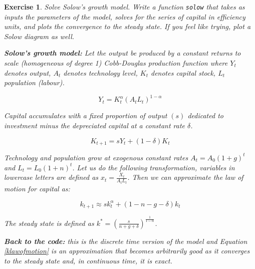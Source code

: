 \documentclass[a4paper,12pt]{article}
\newtheorem{exercise}{Exercise}
\begin{document}
\begin{exercise}
Solve Solow's growth model. Write a function \texttt{solow} that takes as inputs the parameters of the model, solves for the series of capital in efficiency units, and plots the convergence to the steady state. If you feel like trying, plot a Solow diagram as well.
	
	\textbf{Solow's growth model:} Let the output be produced by a constant returns to scale (homogeneous of degree 1) Cobb-Douglas production function where $Y_t$ denotes output, $A_t$ denotes technology level, $K_t$ denotes capital stock, $L_t$ population (labour).
	
	\[
	Y_t = K_t^{\alpha} \left(A_t L_t\right)^{1-\alpha}
	\] 	
	
	Capital accumulates with a fixed proportion of output $(s)$ dedicated to investment minus the depreciated capital at a constant rate $\delta$.
	
	\[
	K_{t+1}	= sY_t +(1-\delta) K_t
	\]
	
	Technology and population grow at exogenous constant rates $A_t = A_0 (1+g)^t$ and $L_t = L_0 (1+n)^t$.	Let us do the following transformation, variables in lowercase letters are defined as $x_t = \frac{X_t}{A_t L_t}$. Then we can approximate the law of motion for capital as:
	
	 \begin{equation}
	 k_{t+1} \approx s k_t^{\alpha} + (1-n-g-\delta)k_t
	\label{klawofmotion}
	 \end{equation}
	
	 
	 The steady state is defined as $k^* = \left(\frac{s}{n+g+\delta}\right)^{\frac{1}{1-\alpha}}$.
	 
	 \textbf{Back to the code:} this is the discrete time version of the model and Equation \eqref{klawofmotion} is an approximation that becomes arbitrarily good as it converges to the steady state and, in continuous time, it is exact.
	 

\end{exercise}
\end{document}
